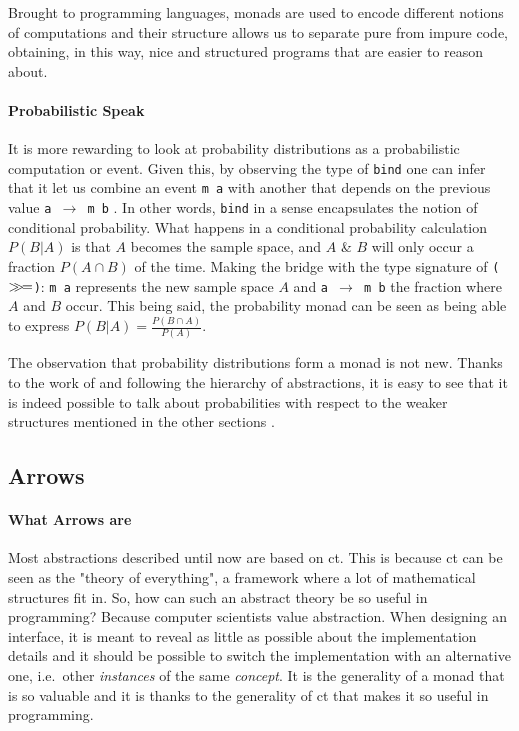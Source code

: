 \documentclass[
  oneside,
  11pt, a4paper,
  footinclude=true,
  headinclude=true,
  cleardoublepage=empty
]{scrbook}
\theoremstyle{definition}
\theoremstyle{definition}
\def\bind{\mathbin{{>\hskip-1ex>\hskip-.4ex=}}}
\begin{document}
	            Brought to programming languages, monads are used to encode different notions of computations and their structure allows us to separate pure from impure code, obtaining, in this way, nice and structured programs that are easier to reason about. 
	            
	 \paragraph{Probabilistic Speak}
	            
	It is more rewarding to look at probability distributions as a probabilistic computation or event. Given this, by observing the type of \texttt{bind} one can infer that it let us combine an event \texttt{m a} with another that depends on the previous value \texttt{a $\rightarrow$ m b} \citep{erwig_kollmansberger_2006}. In other words, \texttt{bind} in a sense encapsulates the notion of conditional probability. What happens in a conditional probability calculation $P(B|A)$ is that $A$ becomes the sample space, and $A$ \& $B$ will only occur a fraction $P(A \cap B)$ of the time. Making the bridge with the type signature of \texttt{($\bind$)}: \texttt{m a} represents the new sample space $A$ and \texttt{a $\rightarrow$ m b} the fraction where $A$ and $B$ occur. This being said, the probability monad can be seen as being able to express $P(B|A) = \frac{P(B \cap A)}{P(A)}$. 
	            
	The observation that probability distributions form a monad is not new. Thanks to the work of \cite{giry1982} and following the hierarchy of abstractions, it is easy to see that it is indeed possible to talk about probabilities with respect to the weaker structures mentioned in the other sections \citep{jtobin, Scibior19}.
	            
	    \subsection{Arrows}
	    
	        \paragraph{What Arrows are}
	        
    Most abstractions described until now are based on \gls{ct}. This is because \gls{ct} can be seen as the "theory of everything", a framework where a lot of mathematical structures fit in. So, how can such an abstract theory be so useful in programming? Because computer scientists value abstraction. When designing an interface, it is meant to reveal as little as possible about the implementation details and it should be possible to switch the implementation with an alternative one, i.e.\ other \emph{instances} of the same \emph{concept}. It is the generality of a monad that is so valuable and it is thanks to the generality of \gls{ct} that makes it so useful in programming.
    	        
\end{document}
